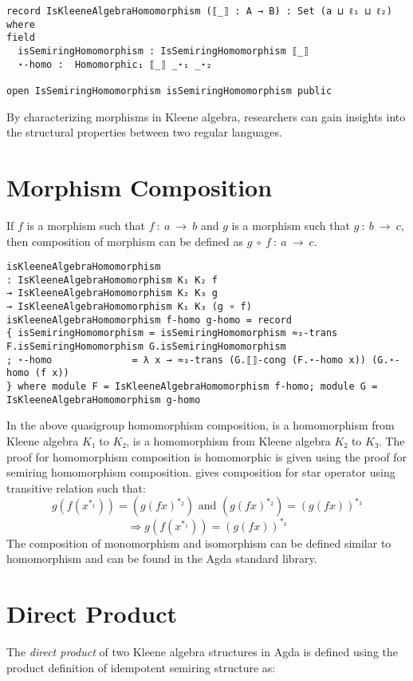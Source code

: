 \begin{verbatim}
record IsKleeneAlgebraHomomorphism (⟦_⟧ : A → B) : Set (a ⊔ ℓ₁ ⊔ ℓ₂) where
field
  isSemiringHomomorphism : IsSemiringHomomorphism ⟦_⟧
  ⋆-homo :  Homomorphic₁ ⟦_⟧ _⋆₁ _⋆₂

open IsSemiringHomomorphism isSemiringHomomorphism public
\end{verbatim}

By characterizing morphisms in Kleene algebra, researchers can gain insights
into the structural properties between two regular languages.

\section{Morphism Composition}
If $f$ is a morphism such that $f\ :\ a \ \rightarrow \ b$ and $g$ is a morphism
such that $g\ :\ b\ \rightarrow \ c$, then composition of morphism can be
defined as $g \ ∘\ f\ :\ a \ \rightarrow \ c$.

\begin{verbatim}
isKleeneAlgebraHomomorphism
: IsKleeneAlgebraHomomorphism K₁ K₂ f
→ IsKleeneAlgebraHomomorphism K₂ K₃ g
→ IsKleeneAlgebraHomomorphism K₁ K₃ (g ∘ f)
isKleeneAlgebraHomomorphism f-homo g-homo = record
{ isSemiringHomomorphism = isSemiringHomomorphism ≈₃-trans F.isSemiringHomomorphism G.isSemiringHomomorphism
; ⋆-homo              = λ x → ≈₃-trans (G.⟦⟧-cong (F.⋆-homo x)) (G.⋆-homo (f x))
} where module F = IsKleeneAlgebraHomomorphism f-homo; module G = IsKleeneAlgebraHomomorphism g-homo
\end{verbatim}

In the above quasigroup homomorphism composition,  is a homomorphism
from Kleene algebra $K₁$ to $K₂$,  is a homomorphism from Kleene
algebra $K₂$ to $K₃$. The proof for homomorphism composition is homomorphic is
given using the proof for semiring homomorphism composition. 
gives composition for star operator using transitive relation such that: 
\[g (f (x^{*_1})) = (g (f x) ^{*_2}) \text{ and } (g (f x) ^{*_2}) = (g (f x))^{*_3}\] 
\[\Rightarrow g (f (x^{*_1})) = (g (f x))^{*_3}\] The composition of
monomorphism and isomorphism can be defined similar to homomorphism and can be
found in the Agda standard library.

\section{Direct Product}
The \textit{direct product} of two Kleene algebra structures in Agda is defined
using the product definition of idempotent semiring structure as:

